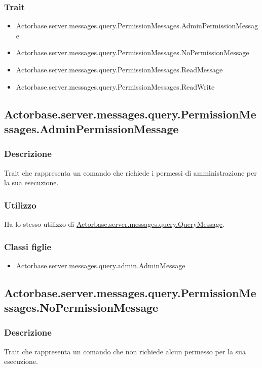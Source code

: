 \documentclass[a4paper]{article}
\begin{document}
			\subsubsection{Trait}
				\begin{itemize}
					\item Actorbase.server.messages.query.PermissionMessages.AdminPermissionMessage
					\item Actorbase.server.messages.query.PermissionMessages.NoPermissionMessage
					\item Actorbase.server.messages.query.PermissionMessages.ReadMessage
					\item Actorbase.server.messages.query.PermissionMessages.ReadWrite
				\end{itemize}
				
		\subsection{Actorbase.server.messages.query.PermissionMessages.AdminPermissionMessage}
			\subsubsection{Descrizione}
				Trait che rappresenta un comando che richiede i permessi di amministrazione per la sua esecuzione.
				
			\subsubsection{Utilizzo}
				Ha lo stesso utilizzo di \hyperref[QueryMessage]{Actorbase.server.messages.query.QueryMessage}.
				
			\subsubsection{Classi figlie}
				\begin{itemize}
					\item Actorbase.server.messages.query.admin.AdminMessage
				\end{itemize}
		
		\subsection{Actorbase.server.messages.query.PermissionMessages.NoPermissionMessage}
			\subsubsection{Descrizione}
				Trait che rappresenta un comando che non richiede alcun permesso per la sua esecuzione.
				
\end{document}
